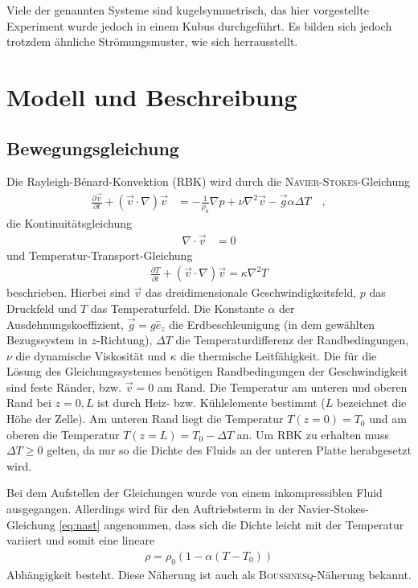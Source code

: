 \documentclass[12pt,a4paper,titlepage,headinclude]{scrartcl}
\numberwithin{equation}{subsection}
\begin{document}
Viele der genannten Systeme sind kugelsymmetrisch, das hier vorgestellte Experiment wurde jedoch in einem Kubus durchgeführt.
Es bilden sich jedoch trotzdem ähnliche Strömungsmuster, wie sich herrausstellt.


\newpage
\section{Modell und Beschreibung}
\label{sec:theorie}

\subsection{Bewegungsgleichung}
Die Rayleigh-Bénard-Konvektion (RBK) wird durch die \textsc{Navier-Stokes}-Gleichung
\begin{align}
	\frac{\partial \vec{v}}{\partial t} + \left(\vec{v}\cdot\nabla\right)\vec{v} &= 
	-\frac{1}{\rho_0}\nabla p+\nu\nabla^2\vec{v}-\vec{g}\alpha\Delta T\quad,\label{eq:nast}
\end{align}
die Kontinuitätsgleichung
\begin{align}
	\nabla\cdot\vec{v} &= 0\label{eq:konti}
\end{align}
und Temperatur-Transport-Gleichung  
\begin{align}
	\frac{\partial T}{\partial t} + \left( \vec{v}\cdot\nabla \right)\vec{v} = \kappa\nabla^2T\label{eq:tempera}
\end{align}
beschrieben.
Hierbei sind $\vec{v}$ das dreidimensionale Geschwindigkeitsfeld, $p$ das Druckfeld und $T$ das Temperaturfeld.
Die Konstante $\alpha$ der Ausdehnungskoeffizient, $\vec{g}=g\hat{e}_z$ die Erdbeschleunigung (in dem gewählten Bezugssystem in $z$-Richtung), $\Delta T$ die Temperaturdifferenz der Randbedingungen, $\nu$ die dynamische Viskosität und $\kappa$ die thermische Leitfähigkeit.
Die für die Lösung des Gleichungssystemes benötigen Randbedingungen der Geschwindigkeit sind feste Ränder, bzw. $\vec{v}=0$ am Rand.
Die Temperatur am unteren und oberen Rand bei $z=0,L$ ist durch Heiz- bzw. Kühlelemente bestimmt ($L$ bezeichnet die Höhe der Zelle).
Am unteren Rand liegt die Temperatur $T(z=0)=T_0$ und am oberen die Temperatur $T(z=L)=T_0-\Delta T$ an.
Um RBK zu erhalten muss $\Delta T\geq0$ gelten, da nur so die Dichte des Fluids an der unteren Platte herabgesetzt wird.

Bei dem Aufstellen der Gleichungen wurde von einem inkompressiblen Fluid ausgegangen.
Allerdings wird für den Auftriebsterm in der Navier-Stokes-Gleichung \eqref{eq:nast} angenommen, dass sich die Dichte leicht mit der Temperatur variiert und somit eine lineare
\begin{align*}
	\rho=\rho_0\left( 1 - \alpha\left( T - T_0 \right) \right)
\end{align*}
Abhängigkeit besteht.
Diese Näherung ist auch als \textsc{Boussinesq}-Näherung bekannt.
\end{document}
